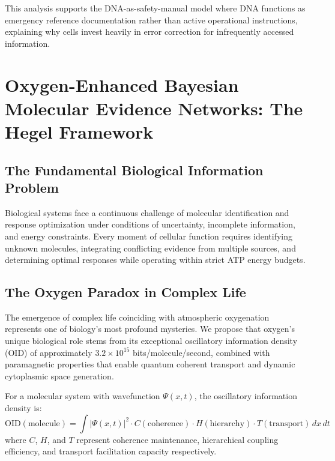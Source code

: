 \documentclass[11pt,a4paper]{article}
\begin{document}
This analysis supports the DNA-as-safety-manual model where DNA functions as emergency reference documentation rather than active operational instructions, explaining why cells invest heavily in error correction for infrequently accessed information.

\section{Oxygen-Enhanced Bayesian Molecular Evidence Networks: The Hegel Framework}

\subsection{The Fundamental Biological Information Problem}

Biological systems face a continuous challenge of molecular identification and response optimization under conditions of uncertainty, incomplete information, and energy constraints. Every moment of cellular function requires identifying unknown molecules, integrating conflicting evidence from multiple sources, and determining optimal responses while operating within strict ATP energy budgets.

\subsection{The Oxygen Paradox in Complex Life}

The emergence of complex life coinciding with atmospheric oxygenation represents one of biology's most profound mysteries. We propose that oxygen's unique biological role stems from its exceptional oscillatory information density (OID) of approximately $3.2 \times 10^{15}$ bits/molecule/second, combined with paramagnetic properties that enable quantum coherent transport and dynamic cytoplasmic space generation.

\begin{definition}
For a molecular system with wavefunction $\Psi(x,t)$, the oscillatory information density is:
\begin{equation}
\text{OID}(\text{molecule}) = \int |\Psi(x,t)|^2 \cdot C(\text{coherence}) \cdot H(\text{hierarchy}) \cdot T(\text{transport}) \, dx \, dt
\end{equation}
where $C$, $H$, and $T$ represent coherence maintenance, hierarchical coupling efficiency, and transport facilitation capacity respectively.
\end{definition}
\end{document}
